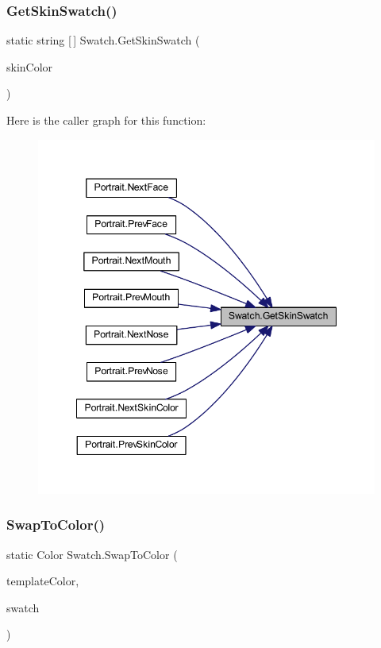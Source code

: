 \subsubsection{\texorpdfstring{GetSkinSwatch()}{GetSkinSwatch()}}
{\footnotesize\ttfamily static string \mbox{[}$\,$\mbox{]} Swatch.\+Get\+Skin\+Swatch (\begin{DoxyParamCaption}\item[{\mbox{\hyperlink{class_character_a726214a0fe480fffada7772697764824}{Character.\+Skin\+Color}}}]{skin\+Color }\end{DoxyParamCaption})\hspace{0.3cm}{\ttfamily [static]}}

Here is the caller graph for this function\+:
\nopagebreak
\begin{figure}[H]
\begin{center}
\leavevmode
\includegraphics[width=348pt]{class_swatch_aad8681cfc4c7902a684220e08e67b00b_icgraph}
\end{center}
\end{figure}
\mbox{\label{class_swatch_aa6e64b48c8403d88179beb90da11c2f8}} 
\subsubsection{\texorpdfstring{SwapToColor()}{SwapToColor()}}
{\footnotesize\ttfamily static Color Swatch.\+Swap\+To\+Color (\begin{DoxyParamCaption}\item[{Color}]{template\+Color,  }\item[{Color \mbox{[}$\,$\mbox{]}}]{swatch }\end{DoxyParamCaption})\hspace{0.3cm}{\ttfamily [static]}}

